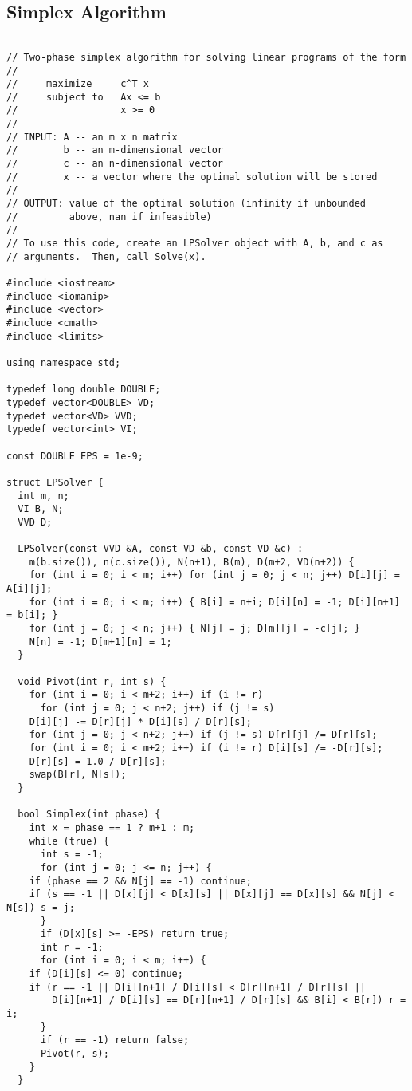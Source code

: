 \subsection{Simplex Algorithm}
\begin{lstlisting}

// Two-phase simplex algorithm for solving linear programs of the form
//
//     maximize     c^T x
//     subject to   Ax <= b
//                  x >= 0
//
// INPUT: A -- an m x n matrix
//        b -- an m-dimensional vector
//        c -- an n-dimensional vector
//        x -- a vector where the optimal solution will be stored
//
// OUTPUT: value of the optimal solution (infinity if unbounded
//         above, nan if infeasible)
//
// To use this code, create an LPSolver object with A, b, and c as
// arguments.  Then, call Solve(x).

#include <iostream>
#include <iomanip>
#include <vector>
#include <cmath>
#include <limits>

using namespace std;

typedef long double DOUBLE;
typedef vector<DOUBLE> VD;
typedef vector<VD> VVD;
typedef vector<int> VI;

const DOUBLE EPS = 1e-9;

struct LPSolver {
  int m, n;
  VI B, N;
  VVD D;

  LPSolver(const VVD &A, const VD &b, const VD &c) : 
    m(b.size()), n(c.size()), N(n+1), B(m), D(m+2, VD(n+2)) {
    for (int i = 0; i < m; i++) for (int j = 0; j < n; j++) D[i][j] = A[i][j];
    for (int i = 0; i < m; i++) { B[i] = n+i; D[i][n] = -1; D[i][n+1] = b[i]; }
    for (int j = 0; j < n; j++) { N[j] = j; D[m][j] = -c[j]; }
    N[n] = -1; D[m+1][n] = 1;
  }
	   
  void Pivot(int r, int s) {
    for (int i = 0; i < m+2; i++) if (i != r)
      for (int j = 0; j < n+2; j++) if (j != s)
	D[i][j] -= D[r][j] * D[i][s] / D[r][s];
    for (int j = 0; j < n+2; j++) if (j != s) D[r][j] /= D[r][s];
    for (int i = 0; i < m+2; i++) if (i != r) D[i][s] /= -D[r][s];
    D[r][s] = 1.0 / D[r][s];
    swap(B[r], N[s]);
  }

  bool Simplex(int phase) {
    int x = phase == 1 ? m+1 : m;
    while (true) {
      int s = -1;
      for (int j = 0; j <= n; j++) {
	if (phase == 2 && N[j] == -1) continue;
	if (s == -1 || D[x][j] < D[x][s] || D[x][j] == D[x][s] && N[j] < N[s]) s = j;
      }
      if (D[x][s] >= -EPS) return true;
      int r = -1;
      for (int i = 0; i < m; i++) {
	if (D[i][s] <= 0) continue;
	if (r == -1 || D[i][n+1] / D[i][s] < D[r][n+1] / D[r][s] ||
	    D[i][n+1] / D[i][s] == D[r][n+1] / D[r][s] && B[i] < B[r]) r = i;
      }
      if (r == -1) return false;
      Pivot(r, s);
    }
  }


\end{lstlisting}
